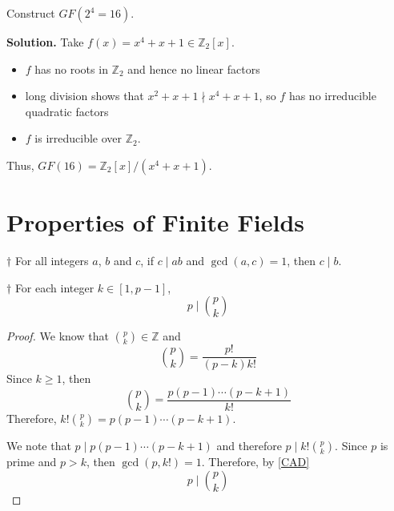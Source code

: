 
\begin{exbox}
    \begin{example}
        Construct $ GF(2^4=16) $.

        \textbf{Solution.} Take $ f(x)=x^4+x+1\in\mathbb{Z}_2[x] $.
        \begin{itemize}
            \item $ f $ has no roots in $ \mathbb{Z}_2 $ and hence no linear factors
            \item long division shows that $ x^2+x+1\nmid x^4+x+1 $, so $ f $
                  has no irreducible quadratic factors
            \item $ f $ is irreducible over $ \mathbb{Z}_2 $.
        \end{itemize}
        Thus, $ GF(16)=\mathbb{Z}_2[x]/(x^4+x+1) $.
    \end{example}
\end{exbox}

\section{Properties of Finite Fields}

\begin{thmbox}
    \begin{prop}\label{CAD}
        $ \dagger $ For all integers $ a $, $ b $ and $ c $, if $ c\mid ab $
        and $ \gcd(a,c)=1 $, then $ c\mid b $.
    \end{prop}
\end{thmbox}

\begin{thmbox}
    \begin{lemma}\label{p divides p choose k}
        $ \dagger $ For each integer $ k\in[1,p-1] $,
        \[ p\mid \binom{p}{k} \]
    \end{lemma}
\end{thmbox}

\begin{proof}
    We know that $ \binom{p}{k}\in\mathbb{Z} $ and
    \[ \binom{p}{k}=\frac{p!}{(p-k)k!} \]
    Since $ k\geqslant 1 $, then
    \[ \binom{p}{k}=\frac{p(p-1)\cdots(p-k+1)}{k!} \]
    Therefore, $ k!\binom{p}{k}=p(p-1)\cdots(p-k+1) $.

    We note that $ p\mid p(p-1)\cdots(p-k+1) $ and therefore
    $ p\mid k!\binom{p}{k} $. Since $ p $ is prime and $ p>k $,
    then $ \gcd(p,k!)=1 $. Therefore, by \ref{CAD}
    \[ p\mid \binom{p}{k} \]
\end{proof}

